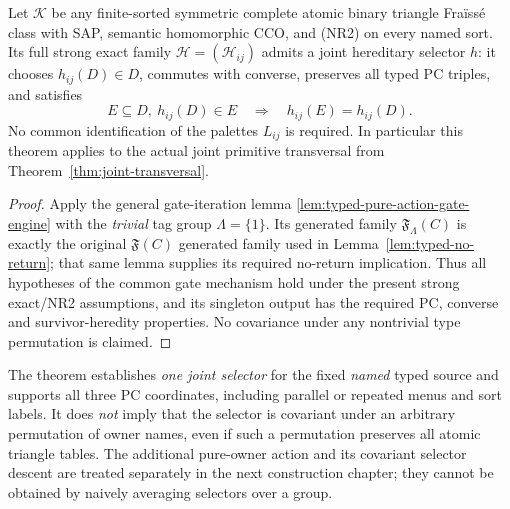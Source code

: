 \begin{theorem}
\label{thm:typed-HS}
Let $\mathcal K$ be any finite-sorted symmetric complete atomic
binary triangle Fra\"iss\'e class with SAP, semantic homomorphic
CCO, and (NR2) on every named sort.  Its full strong exact family
$\mathcal H=(\mathcal H_{ij})$ admits a joint hereditary selector
$h$: it chooses $h_{ij}(D)\in D$, commutes with converse, preserves
all typed PC triples, and satisfies
\begin{equation}\label{eq:HS-heredity}
 E\subseteq D,\ h_{ij}(D)\in E\quad\Longrightarrow\quad
 h_{ij}(E)=h_{ij}(D).
\end{equation}
No common identification of the palettes $L_{ij}$ is required.
In particular this theorem applies to the actual joint primitive
transversal from Theorem~\ref{thm:joint-transversal}.
\end{theorem}
\begin{proof}
Apply the general gate-iteration lemma
\cref{lem:typed-pure-action-gate-engine} with the \emph{trivial}
tag group $\Lambda=\{1\}$.  Its generated family
$\mathfrak F_\Lambda(C)$ is exactly the original
$\mathfrak F(C)$ generated family used in
Lemma~\ref{lem:typed-no-return}; that same lemma
supplies its required no-return implication.  Thus all hypotheses
of the common gate mechanism hold under the present strong
exact/NR2 assumptions, and its singleton output has the
required PC, converse and survivor-heredity properties.
No covariance under any nontrivial type permutation is claimed.
\end{proof}

\begin{remark}
\label{rem:typed-selector-scope}
The theorem establishes \emph{one joint selector} for the fixed
\emph{named} typed source and supports all three PC coordinates,
including parallel or repeated menus and sort labels.  It does
\emph{not} imply that the selector is covariant under an arbitrary
permutation of owner names, even if such a permutation preserves all
atomic triangle tables.  The additional pure-owner action and its
covariant selector descent are treated separately in the next
construction chapter; they cannot be obtained by naively averaging
selectors over a group.
\end{remark}

